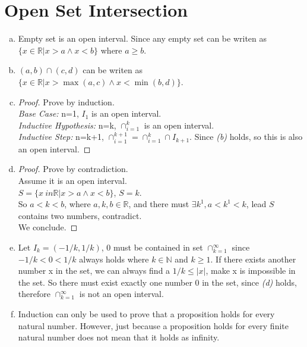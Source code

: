 \documentclass{article}
\begin{document}
    \part*{Open Set Intersection}
    \begin{enumerate}[(a).]
        \item Empty set is an open interval. 
        Since any empty set can be writen as 
        $\{x \in \mathbb{R}|x > a \wedge x < b\}$ where 
        $a \ge b$.

        \item $(a,b)\cap(c,d)$ can be writen as 
        $\{x \in \mathbb{R}|x>\max(a,c) \wedge x<\min(b,d) \}$.
        
        \item \begin{proof}
            Prove by induction.\\
            \emph{Base Case: }n=1, $I_{1}$ is an open interval.\\
            \emph{Inductive Hypothesis: }
            n=k, $\cap_{i=1}^{k}$ is an open interval.\\
            \emph{Inductive Step: }
            n=k+1, $\cap_{i=1}^{k+1} = \cap_{i=1}^{k} \cap I_{k+1}$. 
            Since \emph{(b)} holds, so this is also an open interval.
        \end{proof}

        \item \begin{proof}
            Prove by contradiction.\\
            Assume it is an open interval.\\
            $S = \{x \ in \mathbb{R}|x > a \wedge x < b\}$, $S = {k}$.\\
            So $a < k < b$, where $a, k, b \in \mathbb{R}$, and there must 
            $\exists k^{1}, a < k^{1} < k$, lead $S$ contains two numbers, contradict.\\
            We conclude.
        \end{proof}

        \item Let $I_k=(-1/k,1/k)$, 0 must be contained in set $\cap_{k=1}^{\infty}$ since 
        $-1/k < 0 < 1/k$ always holds where $k \in \mathbb{N}$ and $k \ge 1$. If there exists 
        another number x in the set, we can always find a $1/k \le |x|$, make x is impossible in the set. 
        So there must exist exactly one number 0 in the set, since \emph{(d)} holds, therefore 
        $\cap_{k=1}^{\infty}$ is not an open interval.

        \item Induction can only be used to prove that a proposition holds for every natural number. 
        However, just because a proposition holds for every finite natural number does not mean that 
        it holds as infinity.
    \end{enumerate}
\end{document}
